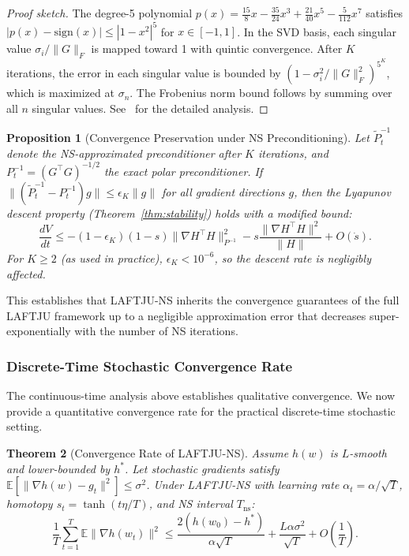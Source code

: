 \documentclass[10pt,twocolumn]{article}
\newtheorem{theorem}{Theorem}
\newtheorem{proposition}[theorem]{Proposition}
\newcommand{\method}{LAFTJU}
\newcommand{\E}{\mathbb{E}}
\begin{document}
\begin{proof}[Proof sketch]
The degree-5 polynomial $p(x) = \frac{15}{8}x - \frac{35}{24}x^3 + \frac{21}{40}x^5 - \frac{5}{112}x^7$ satisfies $|p(x) - \mathrm{sign}(x)| \leq |1-x^2|^5$ for $x \in [-1,1]$. In the SVD basis, each singular value $\sigma_i/\|G\|_F$ is mapped toward 1 with quintic convergence. After $K$ iterations, the error in each singular value is bounded by $(1-\sigma_i^2/\|G\|_F^2)^{5^K}$, which is maximized at $\sigma_n$. The Frobenius norm bound follows by summing over all $n$ singular values. See~\cite{kosson} for the detailed analysis.
\end{proof}

\begin{proposition}[Convergence Preservation under NS Preconditioning]
\label{prop:ns_preserve}
Let $\tilde{P}_t^{-1}$ denote the NS-approximated preconditioner after $K$ iterations, and $P_t^{-1} = (G^\top G)^{-1/2}$ the exact polar preconditioner. If $\|(\tilde{P}_t^{-1} - P_t^{-1})g\| \leq \epsilon_K \|g\|$ for all gradient directions $g$, then the Lyapunov descent property (Theorem~\ref{thm:stability}) holds with a modified bound:
\begin{equation}
\frac{dV}{dt} \leq -(1-\epsilon_K)(1-s)\|\nabla H^\top H\|_{P^{-1}}^2 - s\frac{\|\nabla H^\top H\|^2}{\|H\|} + O(\dot{s}).
\end{equation}
For $K \geq 2$ (as used in practice), $\epsilon_K < 10^{-6}$, so the descent rate is negligibly affected.
\end{proposition}

This establishes that \method{}-NS inherits the convergence guarantees of the full \method{} framework up to a negligible approximation error that decreases super-exponentially with the number of NS iterations.

\subsubsection{Discrete-Time Stochastic Convergence Rate}

The continuous-time analysis above establishes qualitative convergence. We now provide a quantitative convergence rate for the practical discrete-time stochastic setting.

\begin{theorem}[Convergence Rate of \method{}-NS]
\label{thm:rate}
Assume $h(w)$ is $L$-smooth and lower-bounded by $h^*$. Let stochastic gradients satisfy $\E[\|\nabla h(w) - g_t\|^2] \leq \sigma^2$. Under \method{}-NS with learning rate $\alpha_t = \alpha/\sqrt{T}$, homotopy $s_t = \tanh(t\eta/T)$, and NS interval $T_\mathrm{ns}$:
\begin{equation}
\frac{1}{T}\sum_{t=1}^T \E\|\nabla h(w_t)\|^2 \leq \frac{2(h(w_0) - h^*)}{\alpha\sqrt{T}} + \frac{L\alpha\sigma^2}{\sqrt{T}} + O\!\left(\frac{1}{T}\right).
\end{equation}
\end{theorem}
\end{document}
